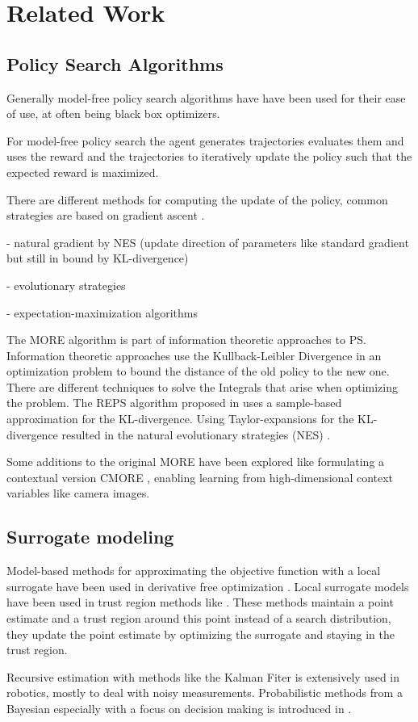 
\chapter{Related Work}

\section{Policy Search Algorithms}
Generally model-free policy search algorithms have have been used
for their ease of use, at often being black box optimizers.

For model-free policy search the agent generates trajectories
evaluates them and uses the reward and the trajectories to
iteratively update the policy such that the expected reward is maximized.

There are different methods for computing the update of the
policy, common strategies are based on gradient ascent
\citet{peters2006policy}.

- natural gradient by NES (update direction of parameters like standard
gradient but still in bound by KL-divergence)

- evolutionary strategies

- expectation-maximization algorithms

The MORE algorithm is part of information theoretic approaches
to PS.
Information theoretic approaches use
the Kullback-Leibler Divergence in an optimization problem
to bound the distance of the old policy to the new one.
There are different techniques to solve the Integrals that arise
when optimizing the problem.
The REPS algorithm proposed in \cite{peters2010relative} uses a
sample-based approximation for the KL-divergence.
Using Taylor-expansions for the KL-divergence resulted in the natural
evolutionary strategies (NES) \cite{wierstra2014natural}.

Some additions to the original MORE have been explored like formulating
a contextual version CMORE \citet{tangkaratt2017policy}, enabling learning from high-dimensional
context variables like camera images.

\section{Surrogate modeling}
Model-based methods for approximating the objective function
with a local surrogate have been used in
derivative free optimization \citet{nocedal2006numerical}.
Local surrogate models have been used in trust region methods like \citet{powell2009bobyqa}. These methods maintain a point estimate
and a trust region around this point instead
of a search distribution, they update the point estimate by optimizing
the surrogate and staying in the trust region.

Recursive estimation with methods like
the Kalman Fiter is extensively used in robotics, mostly to deal with
noisy measurements. Probabilistic methods from
a Bayesian especially with a focus on decision making
is introduced in \citet{thrun2002probabilistic}.

